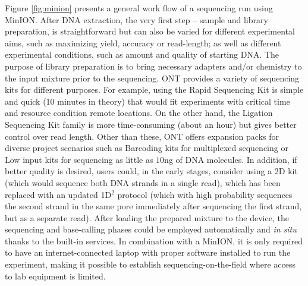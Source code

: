 Figure \ref{fig:minion} presents a general work flow of a sequencing run using MinION.
After DNA extraction, the very first step -- sample and library preparation, is straightforward but can also be varied for different experimental aims, such as maximizing yield, accuracy or read-length; as well as different experimental conditions, such as amount and quality of starting DNA.  
The purpose of library preparation is to bring necessary adapters and/or chemistry to the input mixture prior to the sequencing. 
ONT provides a variety of sequencing kits for different purposes.  For example, using the Rapid Sequencing Kit is simple and quick (10 minutes in theory) that would fit experiments with critical time and resource condition \EG{} remote locations. On the other hand, the Ligation Sequencing Kit family is more time-consuming  (about an hour) but gives better control over read length.
Other than these, ONT offers expansion packs for diverse project scenarios such as Barcoding kits for multiplexed sequencing or Low input kits for sequencing as little as $10$ng of DNA molecules.
In addition, if better quality is desired, users could, in the early stages, consider using a 2D kit (which would sequence both DNA strands in a single read), which has been replaced with an updated 1D$^2$ protocol (which with high probability sequences the second strand in the same pore immediately after sequencing the first strand, but as a separate read). 
After loading the prepared mixture to the device, the sequencing and base-calling phases could be employed automatically and \emph{in situ} thanks to the built-in services. In combination with a MinION, it is only required to have an internet-connected laptop with proper software installed to run the experiment, making it possible to establish sequencing-on-the-field where access to lab equipment is limited.

